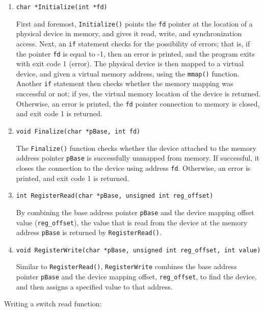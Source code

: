\documentclass[
	letterpaper, %
	10pt, %
]{CSUniSchoolLabReport}
\begin{document}
    \begin{enumerate}

      \item \texttt{char *Initialize(int *fd)}

        First and foremost, \texttt{Initialize()} points the \texttt{fd} pointer at the location of a physical device in memory, and gives it read, write, and synchronization access. Next, an \texttt{if} statement checks for the possibility of errors; that is, if the pointer \texttt{fd} is equal to -1, then an error is printed, and the program exits with exit code 1 (error). The physical device is then mapped to a virtual device, and given a virtual memory address, using the \texttt{mmap()} function. Another \texttt{if} statement then checks whether the memory mapping was successful or not; if yes, the virtual memory location of the device is returned. Otherwise, an error is printed, the \texttt{fd} pointer connection to memory is closed, and exit code 1 is returned.

      \item \texttt{void Finalize(char *pBase, int fd)}

        The \texttt{Finalize()} function checks whether the device attached to the memory address pointer \texttt{pBase} is successfully unmapped from memory. If successful, it closes the connection to the device using address \texttt{fd}. Otherwise, an error is printed, and exit code 1 is returned.

      \item \texttt{int RegisterRead(char *pBase, unsigned int reg\_offset)}

        By combining the base address pointer \texttt{pBase} and the device mapping offset value (\texttt{reg\_offset}), the value that is read from the device at the memory address \texttt{pBase} is returned by \texttt{RegisterRead()}.

      \item \texttt{void RegisterWrite(char *pBase, unsigned int reg\_offset, int value)}

        Similar to \texttt{RegisterRead()}, \texttt{RegisterWrite} combines the base address pointer \texttt{pBase} and the device mapping offset, \texttt{reg\_offset}, to find the device, and then assigns a specified value to that address.

    \end{enumerate}

  \item Writing a switch read function:
\end{document}
